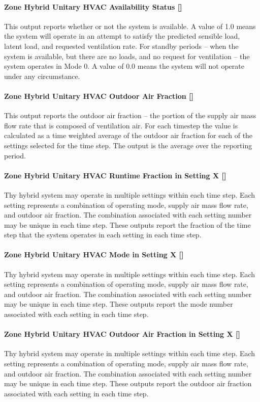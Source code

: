 \paragraph{Zone Hybrid Unitary HVAC Availability Status []}
This output reports whether or not the system is available. A value of 1.0 means the system will operate in an attempt to satisfy the predicted sensible load, latent load, and requested ventilation rate. For standby periods – when the system is available, but there are no loads, and no request for ventilation – the system operates in Mode 0. A value of 0.0 means the system will not operate under any circumstance.

\paragraph{Zone Hybrid Unitary HVAC Outdoor Air Fraction []}
This output reports the outdoor air fraction – the portion of the supply air mass flow rate that is composed of ventilation air. For each timestep the value is calculated as a time weighted average of the outdoor air fraction for each of the settings selected for the time step. The output is the average over the reporting period.

\paragraph{Zone Hybrid Unitary HVAC Runtime Fraction in Setting X []}
Thy hybrid system may operate in multiple settings within each time step. Each setting represents a combination of operating mode, supply air mass flow rate, and outdoor air fraction. The combination associated with each setting number may be unique in each time step. These outputs report the fraction of the time step that the system operates in each setting in each time step.

\paragraph{Zone Hybrid Unitary HVAC Mode in Setting X []}
Thy hybrid system may operate in multiple settings within each time step. Each setting represents a combination of operating mode, supply air mass flow rate, and outdoor air fraction. The combination associated with each setting number may be unique in each time step. These outputs report the mode number associated with each setting in each time step.

\paragraph{Zone Hybrid Unitary HVAC Outdoor Air Fraction in Setting X []}
Thy hybrid system may operate in multiple settings within each time step. Each setting represents a combination of operating mode, supply air mass flow rate, and outdoor air fraction. The combination associated with each setting number may be unique in each time step. These outputs report the outdoor air fraction associated with each setting in each time step.

